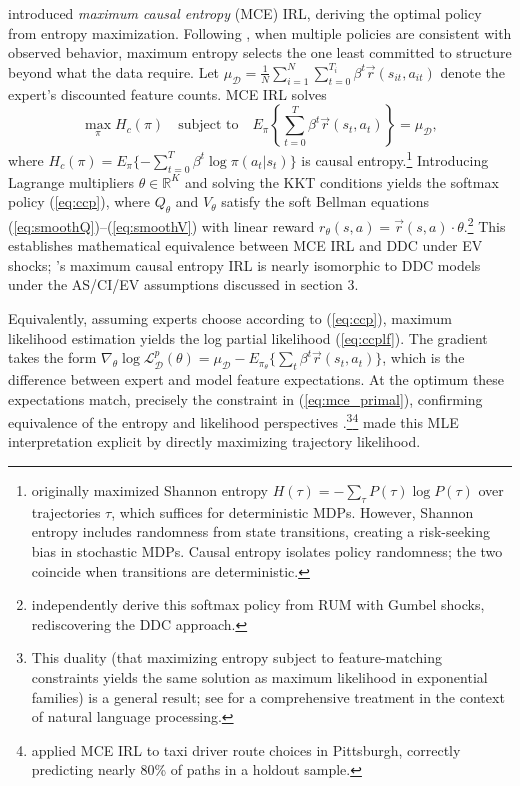 \citet{ziebart:2010} introduced {\it maximum causal entropy\/} (MCE) IRL, deriving the optimal policy from entropy maximization. Following \citet{jaynes:1957}, when multiple policies are consistent with observed behavior, maximum entropy selects the one least committed to structure beyond what the data require. Let $\mu_{\mathcal{D}} = \frac{1}{N}\sum_{i=1}^{N}\sum_{t=0}^{T_i} \beta^t \vec{r}(s_{it},a_{it})$ denote the expert's discounted feature counts. MCE IRL solves
\begin{equation}
    \max_{\pi} H_c(\pi) \quad \text{subject to} \quad E_\pi\left\{\sum_{t=0}^{T} \beta^t \vec{r}(s_t,a_t)\right\} = \mu_{\mathcal{D}},
\label{eq:mce_primal}
\end{equation}
where $H_c(\pi) = E_\pi\{-\sum_{t=0}^{T} \beta^t \log \pi(a_t|s_t)\}$ is causal entropy.\footnote{\footnotesize \citet{ziebart:2008} originally maximized Shannon entropy $H(\tau) = -\sum_\tau P(\tau)\log P(\tau)$ over trajectories $\tau$, which suffices for deterministic MDPs. However, Shannon entropy includes randomness from state transitions, creating a risk-seeking bias in stochastic MDPs. Causal entropy isolates policy randomness; the two coincide when transitions are deterministic.} Introducing Lagrange multipliers $\theta \in \mathbb{R}^K$ and solving the KKT conditions yields the softmax policy (\ref{eq:ccp}), where $Q_\theta$ and $V_\theta$ satisfy the soft Bellman equations (\ref{eq:smoothQ})--(\ref{eq:smoothV}) with linear reward $r_\theta(s,a) = \vec{r}(s,a) \cdot \theta$.\footnote{\footnotesize \citet{pitombeira:2024} independently derive this softmax policy from RUM with Gumbel shocks, rediscovering the DDC approach.} This establishes mathematical equivalence between MCE IRL and DDC under EV shocks; \citet{ziebart:2010}'s maximum causal entropy IRL is nearly isomorphic to DDC models under the AS/CI/EV assumptions discussed in section 3.

Equivalently, assuming experts choose according to (\ref{eq:ccp}), maximum likelihood estimation yields the log partial likelihood (\ref{eq:ccplf}). The gradient takes the form $\nabla_\theta \log \mathcal{L}^p_{\mathcal{D}}(\theta) = \mu_{\mathcal{D}} - E_{\pi_\theta}\{\sum_{t} \beta^t \vec{r}(s_t,a_t)\}$, which is the difference between expert and model feature expectations. At the optimum these expectations match, precisely the constraint in (\ref{eq:mce_primal}), confirming equivalence of the entropy and likelihood perspectives \citep{ziebart:2010}.\footnote{\footnotesize This duality (that maximizing entropy subject to feature-matching constraints yields the same solution as maximum likelihood in exponential families) is a general result; see \citet{berger:1996} for a comprehensive treatment in the context of natural language processing.}\footnote{\footnotesize \citet{ziebart:2008} applied MCE IRL to taxi driver route choices in Pittsburgh, correctly predicting nearly 80\% of paths in a holdout sample.} \citet{mlirl:2011} made this MLE interpretation explicit by directly maximizing trajectory likelihood.

